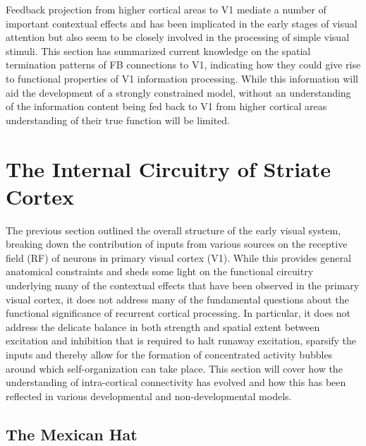 Feedback projection from higher cortical areas to V1 mediate a number
of important contextual effects and has been implicated in the early
stages of visual attention but also seem to be closely involved in the
processing of simple visual stimuli. This section has summarized
current knowledge on the spatial termination patterns of FB
connections to V1, indicating how they could give rise to functional
properties of V1 information processing. While this information will
aid the development of a strongly constrained model, without an
understanding of the information content being fed back to V1 from
higher cortical areas understanding of their true function will be
limited.

\section{The Internal Circuitry of Striate Cortex}

The previous section outlined the overall structure of the early visual
system, breaking down the contribution of inputs from various sources
on the receptive field (RF) of neurons in primary visual cortex
(V1). While this provides general anatomical constraints and sheds
some light on the functional circuitry underlying many of the
contextual effects that have been observed in the primary visual
cortex, it does not address many of the fundamental questions about
the functional significance of recurrent cortical processing. In
particular, it does not address the delicate balance in both strength
and spatial extent between excitation and inhibition that is required
to halt runaway excitation, sparsify the inputs and thereby allow for
the formation of concentrated activity bubbles around which
self-organization can take place. This section will cover how the
understanding of intra-cortical connectivity has evolved and how this
has been reflected in various developmental and non-developmental
models.

\subsection{The Mexican Hat} \label{MexicanHat}

